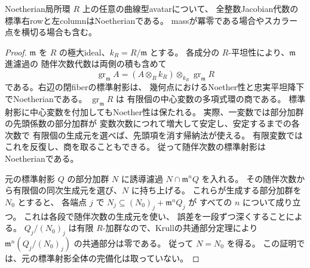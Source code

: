 \begin{corollary}[局所試験基底上の全avatarのNoether性]
\label{cor:qa-avatar-all-local-noetherian}
Noetherian局所環 $R$ 上の任意の曲線型avatarについて、
全整数Jacobian代数の標準右rowと左columnはNoetherianである。
massが冪零である場合やスカラー点を横切る場合も含む。
\end{corollary}
\begin{proof}
$\mathfrak m$ を $R$ の極大ideal、$k_R=R/\mathfrak m$ とする。
各成分の $R$-平坦性により、$\mathfrak m$ 進濾過の
随伴次数代数は両側の積も含めて
\[
 \operatorname{gr}_{\mathfrak m}A
   = (A\otimes_R k_R)\otimes_{k_R}
                 \operatorname{gr}_{\mathfrak m}R
\]
である。右辺の閉fiberの標準射影は、
幾何点におけるNoether性と忠実平坦降下でNoetherianである。
$\operatorname{gr}_{\mathfrak m}R$ は
有限個の中心変数の多項式環の商である。
標準射影に中心変数を付加してもNoether性は保たれる。
実際、一変数では部分加群の先頭係数の部分加群が
変数次数につれて増大して安定し、安定するまでの各次数で
有限個の生成元を選べば、先頭項を消す帰納法が使える。
有限変数ではこれを反復し、商を取ることもできる。
従って随伴次数の標準射影はNoetherianである。

元の標準射影 $Q$ の部分加群 $N$ に誘導濾過
$N\cap\mathfrak m^nQ$ を入れる。
その随伴次数から有限個の同次生成元を選び、$N$ に持ち上げる。
これらが生成する部分加群を $N_0$ とすると、
各端点 $j$ で $N_j\subseteq (N_0)_j+\mathfrak m^nQ_j$ が
すべての $n$ について成り立つ。
これは各段で随伴次数の生成元を使い、
誤差を一段ずつ深くすることによる。
$Q_j/(N_0)_j$ は有限 $R$-加群なので、Krullの共通部分定理により
$\mathfrak m^n(Q_j/(N_0)_j)$ の共通部分は零である。
従って $N=N_0$ を得る。
この証明では、元の標準射影全体の完備化は取っていない。
\end{proof}

